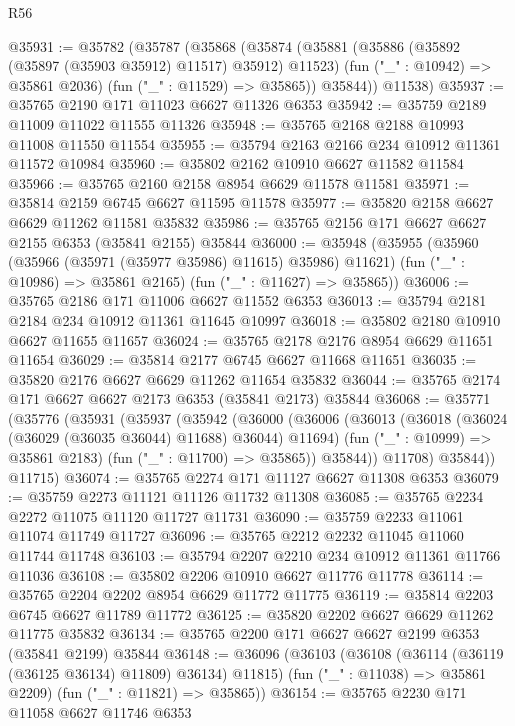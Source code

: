 \begin{lexlean}{R56}
\begin{coremodule}
@35931 := @35782
    (@35787
      (@35868
        (@35874
          (@35881
            (@35886 (@35892 (@35897 (@35903 @35912) @11517) @35912) @11523)
            (fun ("_" : @10942) => @35861 @2036)
            (fun ("_" : @11529) => @35865))
          @35844))
      @11538)
@35937 := @35765 @2190 @171 @11023 @6627 @11326 @6353
@35942 := @35759 @2189 @11009 @11022 @11555 @11326
@35948 := @35765 @2168 @2188 @10993 @11008 @11550 @11554
@35955 := @35794 @2163 @2166 @234 @10912 @11361 @11572 @10984
@35960 := @35802 @2162 @10910 @6627 @11582 @11584
@35966 := @35765 @2160 @2158 @8954 @6629 @11578 @11581
@35971 := @35814 @2159 @6745 @6627 @11595 @11578
@35977 := @35820 @2158 @6627 @6629 @11262 @11581 @35832
@35986 := @35765 @2156 @171 @6627 @6627 @2155 @6353 (@35841 @2155) @35844
@36000 := @35948
    (@35955
      (@35960 (@35966 (@35971 (@35977 @35986) @11615) @35986) @11621)
      (fun ("_" : @10986) => @35861 @2165)
      (fun ("_" : @11627) => @35865))
@36006 := @35765 @2186 @171 @11006 @6627 @11552 @6353
@36013 := @35794 @2181 @2184 @234 @10912 @11361 @11645 @10997
@36018 := @35802 @2180 @10910 @6627 @11655 @11657
@36024 := @35765 @2178 @2176 @8954 @6629 @11651 @11654
@36029 := @35814 @2177 @6745 @6627 @11668 @11651
@36035 := @35820 @2176 @6627 @6629 @11262 @11654 @35832
@36044 := @35765 @2174 @171 @6627 @6627 @2173 @6353 (@35841 @2173) @35844
@36068 := @35771
    (@35776
      (@35931
        (@35937
          (@35942
            (@36000
              (@36006
                (@36013
                  (@36018 (@36024 (@36029 (@36035 @36044) @11688) @36044) @11694)
                  (fun ("_" : @10999) => @35861 @2183)
                  (fun ("_" : @11700) => @35865))
                @35844))
            @11708)
          @35844))
      @11715)
@36074 := @35765 @2274 @171 @11127 @6627 @11308 @6353
@36079 := @35759 @2273 @11121 @11126 @11732 @11308
@36085 := @35765 @2234 @2272 @11075 @11120 @11727 @11731
@36090 := @35759 @2233 @11061 @11074 @11749 @11727
@36096 := @35765 @2212 @2232 @11045 @11060 @11744 @11748
@36103 := @35794 @2207 @2210 @234 @10912 @11361 @11766 @11036
@36108 := @35802 @2206 @10910 @6627 @11776 @11778
@36114 := @35765 @2204 @2202 @8954 @6629 @11772 @11775
@36119 := @35814 @2203 @6745 @6627 @11789 @11772
@36125 := @35820 @2202 @6627 @6629 @11262 @11775 @35832
@36134 := @35765 @2200 @171 @6627 @6627 @2199 @6353 (@35841 @2199) @35844
@36148 := @36096
    (@36103
      (@36108 (@36114 (@36119 (@36125 @36134) @11809) @36134) @11815)
      (fun ("_" : @11038) => @35861 @2209)
      (fun ("_" : @11821) => @35865))
@36154 := @35765 @2230 @171 @11058 @6627 @11746 @6353

\end{coremodule}
\end{lexlean}
